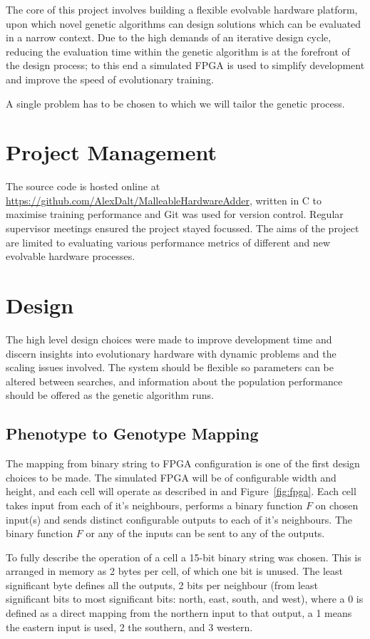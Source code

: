 The core of this project involves building a flexible evolvable hardware
platform, upon which novel genetic algorithms can design solutions which can be
evaluated in a narrow context. Due to the high demands of an iterative
design cycle, reducing the evaluation time within the genetic algorithm is
at the forefront of the design process; to this end a simulated FPGA is used
to simplify development and improve the speed of evolutionary training.

A single problem has to be chosen to which we will tailor the genetic process.

\section{Project Management}
The source code is hosted online at \url{https://github.com/AlexDalt/MalleableHardwareAdder},
written in C to maximise training performance and Git was used for version control.
Regular supervisor meetings ensured the project stayed focussed. The aims
of the project are limited to evaluating various performance metrics of
different and new evolvable hardware processes.

\section{Design}
The high level design choices were made to improve development time
and discern insights into evolutionary hardware with dynamic problems and
the scaling issues involved. The system should be flexible so parameters can
be altered between searches, and information
about the population performance should be offered as the genetic algorithm runs.

\subsection{Phenotype to Genotype Mapping}
The mapping from binary string to FPGA configuration is one of the first design
choices to be made. The simulated FPGA will be of configurable width and height, and each
cell will operate as described in \cite{10.1007/3-540-63173-9_61} and
Figure~\ref{fig:fpga}. Each cell takes
input from each of it's neighbours, performs a binary function $F$ on chosen input(s)
and sends distinct configurable outputs to each of it's neighbours. The binary
function $F$ or any of the inputs can be sent to any of the outputs.

To fully describe the operation of a cell a 15-bit binary string was chosen.
This is arranged in memory as 2 bytes per cell, of which one bit is unused.
The least significant byte defines all the outputs, 2 bits per neighbour
(from least significant bits to most significant bits: north, east, south,
and west), where a 0 is defined as a direct mapping from the northern input
to that output, a 1 means the eastern input is used, 2 the southern, and 3
western.

